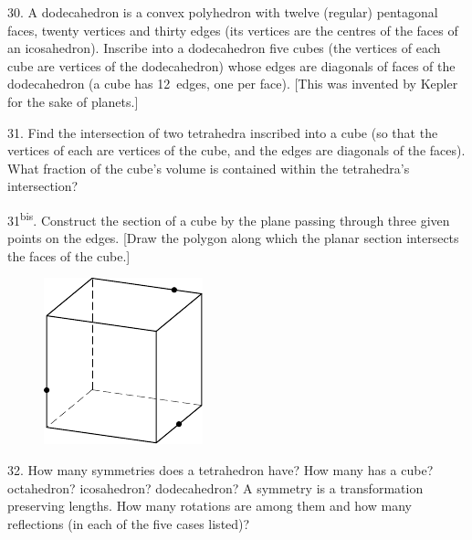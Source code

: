 \begin{problem}{30.}
	A dodecahedron is a convex polyhedron with twelve (regular) pentagonal
	faces, twenty vertices
	and thirty edges (its vertices are the centres of the faces of an icosahedron).
	Inscribe into a dodecahedron five cubes (the vertices of each cube are vertices of the dodecahedron)
	whose edges are diagonals of faces of the dodecahedron (a cube has 12~edges, one per face).
	[This was invented by Kepler for the sake of planets.] 
\end{problem}

\begin{problem}{31.}
	Find the intersection of two tetrahedra inscribed into a cube (so that the vertices of each are
	vertices of the cube, and the edges are diagonals of the faces). 
	What fraction of the cube's volume is contained within the tetrahedra's intersection?
\end{problem}

\begin{problem}{31\textsuperscript{bis}.}
	Construct the section of a cube by the plane passing through three given points on the edges.
	[Draw the polygon along which the planar section intersects the faces of the cube.]
	\begin{figure}
		\includegraphics{taskbook-15}
	\end{figure}
\end{problem}

\begin{problem}{32.}
	How many symmetries does a tetrahedron have? How many has a cube? octahedron? icosahedron?
	dodecahedron? A symmetry is a transformation preserving lengths.
	How many rotations are among them and how many reflections (in each of the five cases listed)?
\end{problem}

